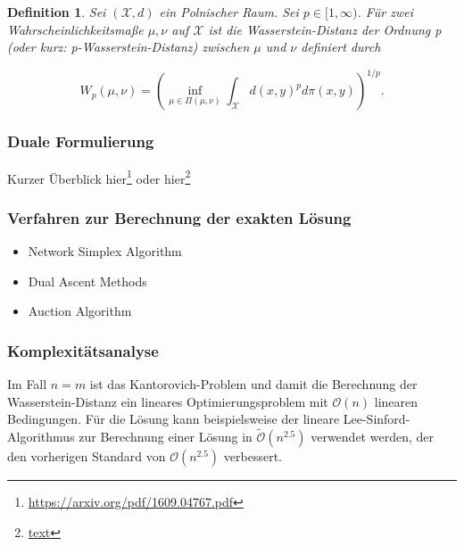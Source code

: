 \documentclass[11pt,a4paper]{article}
\def\emph#1{\textit{#1}}
\newtheorem{definition}[theorem]{Definition}
\numberwithin{equation}{section}
\begin{document}
	\begin{definition}\cite{villani2009optimal}
		Sei $(\mathcal{X},d)$ ein Polnischer Raum. Sei $p\in [1, \infty)$. Für zwei Wahrscheinlichkeitsmaße $\mu, \nu$ auf $\mathcal{X}$ ist die \emph{Wasserstein-Distanz der Ordnung p} (oder kurz: p-Wasserstein-Distanz) zwischen $\mu$ und $\nu$ definiert durch
		
		\begin{equation}
		W_p(\mu, \nu) = \left( \inf_{\mu \in \Pi(\mu, \nu)}\int_{\mathcal{X}}{d(x,y)^pd\pi(x,y)}\right) ^{1/p}.
		\end{equation}	
	\end{definition}
	\subsubsection{Duale Formulierung}
	Kurzer Überblick hier\footnote{\url{https://arxiv.org/pdf/1609.04767.pdf}}
	oder hier\footnote{\url{text}} %
	
	
	
	\subsubsection{Verfahren zur Berechnung der exakten Lösung}
	\begin{itemize}
		\item Network Simplex Algorithm
		\item Dual Ascent Methods
		\item Auction Algorithm
	\end{itemize}
	
	\subsubsection{Komplexitätsanalyse}
	Im Fall $n=m$ ist das Kantorovich-Problem und damit die Berechnung der Wasserstein-Distanz ein lineares Optimierungsproblem mit $\mathcal{O}(n)$ linearen Bedingungen. Für die Lösung kann beispielsweise der lineare Lee-Sinford-Algorithmus zur Berechnung einer Lösung in $\tilde{\mathcal{O}}(n^{2.5})$ \cite{lee2014path} verwendet werden, der den vorherigen Standard von $\mathcal{O}(n^{2.5})$ \cite{renegar1988polynomial} verbessert.
\end{document}
